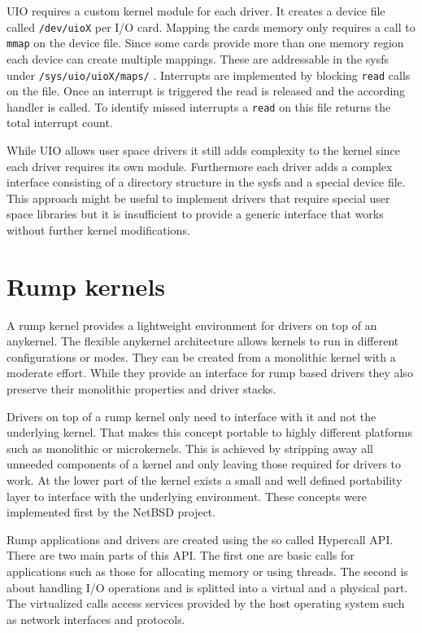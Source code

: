 \documentclass[
a4paper,
12pt,
notitlepage,
parskip=half,
DIV=11,
]{scrbook}
\begin{document}
		UIO requires a custom kernel module for each driver.
		It creates a device file called \texttt{/dev/uioX} per I/O card.
		Mapping the cards memory only requires a call to \texttt{mmap} on the device file.
		Since some cards provide more than one memory region each device can create multiple mappings.
		These are addressable in the sysfs \citep{sysfs} under \texttt{/sys/uio/uioX/maps/} \citep{uio}.
		Interrupts are implemented by blocking \texttt{read} calls on the file.
		Once an interrupt is triggered the read is released and the according handler is called.
		To identify missed interrupts a \texttt{read} on this file returns the total interrupt count. \citep{uio}
		
		While UIO allows user space drivers it still adds complexity to the kernel since each driver requires its own module.
		Furthermore each driver adds a complex interface consisting of a directory structure in the sysfs and a special device file.
		This approach might be useful to implement drivers that require special user space libraries but it is insufficient to provide a generic interface that works without further kernel modifications.
		
		\section{Rump kernels}
		
		A rump kernel provides a lightweight environment for drivers on top of an anykernel.
		The flexible anykernel architecture allows kernels to run in different configurations or modes.
		They can be created from a monolithic kernel with a moderate effort.
		While they provide an interface for rump based drivers they also preserve their monolithic properties and driver stacks. \citep{kantee}
		
		Drivers on top of a rump kernel only need to interface with it and not the underlying kernel.
		That makes this concept portable to highly different platforms such as monolithic or microkernels.
		This is achieved by stripping away all unneeded components of a kernel and only leaving those required for drivers to work.
		At the lower part of the kernel exists a small and well defined portability layer to interface with the underlying environment.
		These concepts were implemented first by the NetBSD project. \citep{bsd_rump}\citep{fosdem_rump}\citep{rump}
		
		Rump applications and drivers are created using the so called Hypercall API.
		There are two main parts of this API.
		The first one are basic calls for applications such as those for allocating memory or using threads.
		The second is about handling I/O operations and is splitted into a virtual and a physical part.
		The virtualized calls access services provided by the host operating system such as network interfaces and protocols. \citep{rump_man} \citep{rump_platform}
		
\end{document}
